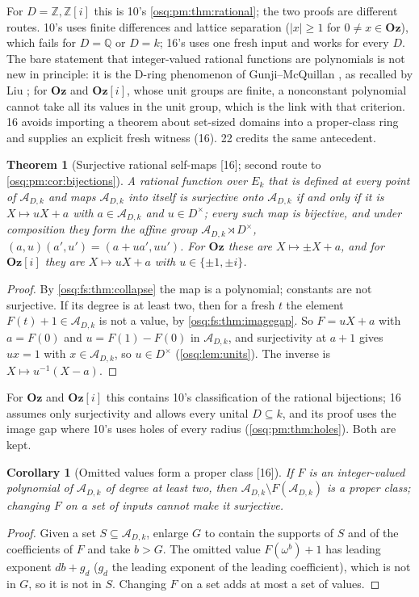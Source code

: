 \documentclass[11pt,letterpaper]{article}
\numberwithin{equation}{section}
\newtheorem{theorem}{Theorem}[section]
\newtheorem{corollary}[corollary]{Corollary}
\theoremstyle{definition}
\theoremstyle{remark}
\theoremstyle{plain}
\newcommand{\Oz}{\mathbf{Oz}}
\newcommand{\GOz}{\Oz[i]}
\newcommand{\Z}{\mathbb Z}
\newcommand{\Q}{\mathbb Q}
\newcommand{\A}{\mathcal A}          %
\newcommand{\src}[1]{\textup{\textsf{[#1]}}}
\begin{document}
For $D=\Z,\Z[i]$ this is 10's \cref{osq:pm:thm:rational}; the two proofs are different routes. 10's uses finite differences and
lattice separation ($|x|\ge1$ for $0\ne x\in\Oz$), which fails for $D=\Q$ or $D=k$; 16's uses one fresh input and works for every $D$. The
bare statement that integer-valued rational functions are polynomials is not new in principle: it is the D-ring phenomenon of
Gunji--McQuillan \cite{GunjiMcQuillan}, as recalled by Liu \cite[Proposition~1.12]{Liu}; for $\Oz$ and $\GOz$, whose unit groups are finite,
a nonconstant polynomial cannot take all its values in the unit group, which is the link with that criterion. 16 avoids importing a
theorem about set-sized domains into a proper-class ring and supplies an explicit fresh witness (16). 22 credits the same antecedent.

\begin{theorem}[Surjective rational self-maps \src{16}; second route to \cref{osq:pm:cor:bijections}]\label{osq:fs:thm:surjective}
A rational function over $E_k$ that is defined at every point of $\A_{D,k}$ and maps $\A_{D,k}$ into itself is surjective onto $\A_{D,k}$
if and only if it is $X\mapsto uX+a$ with $a\in\A_{D,k}$ and $u\in D^\times$; every such map is
bijective, and under composition they form the affine group $\A_{D,k}\rtimes D^\times$, $(a,u)(a',u')=(a+ua',uu')$. For $\Oz$ these are
$X\mapsto\pm X+a$, and for $\GOz$ they are $X\mapsto uX+a$ with $u\in\{\pm1,\pm i\}$.
\end{theorem}
\begin{proof}
By \cref{osq:fs:thm:collapse} the map is a polynomial; constants are not surjective. If its degree is at least two, then for a fresh $t$ the
element $F(t)+1\in\A_{D,k}$ is not a value, by \cref{osq:fs:thm:imagegap}. So $F=uX+a$ with $a=F(0)$ and $u=F(1)-F(0)$ in $\A_{D,k}$, and
surjectivity at $a+1$ gives $ux=1$ with $x\in\A_{D,k}$, so $u\in D^\times$ (\cref{osq:lem:units}). The inverse is $X\mapsto u^{-1}(X-a)$.
\end{proof}

For $\Oz$ and $\GOz$ this contains 10's classification of the rational bijections; 16 assumes only surjectivity and allows every unital
$D\subseteq k$, and its proof uses the image gap where 10's uses holes of every radius (\cref{osq:pm:thm:holes}). Both are kept.

\begin{corollary}[Omitted values form a proper class \src{16}]\label{osq:fs:cor:omitted}
If $F$ is an integer-valued polynomial of $\A_{D,k}$ of degree at least two, then $\A_{D,k}\setminus F(\A_{D,k})$ is a proper class; changing
$F$ on a set of inputs cannot make it surjective.
\end{corollary}
\begin{proof}
Given a set $S\subseteq\A_{D,k}$, enlarge $G$ to contain the supports of $S$ and of the coefficients of $F$ and take $b>G$. The omitted value
$F(\omega^b)+1$ has leading exponent $db+g_d$ ($g_d$ the leading exponent of the leading coefficient), which is not in $G$, so it is not in $S$.
Changing $F$ on a set adds at most a set of values.
\end{proof}
\end{document}

